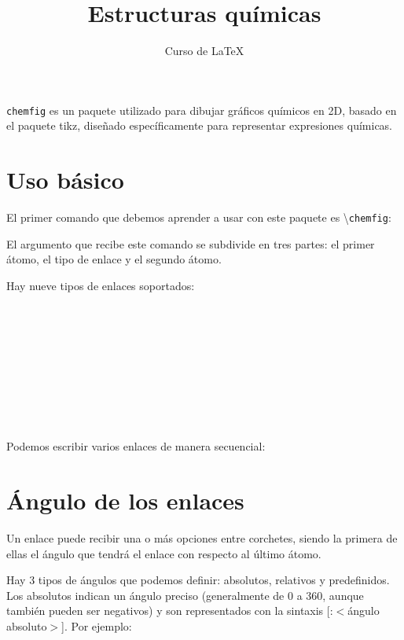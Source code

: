 \documentclass[12pt,letterpaper]{article}
\author{Curso de \LaTeX}
\title{Estructuras químicas}
\begin{document}
\maketitle

\texttt{chemfig} es un paquete utilizado para dibujar gráficos químicos en 2D, basado en el paquete tikz, diseñado específicamente para representar expresiones químicas.

\section{Uso básico}

El primer comando que debemos aprender a usar con este paquete es \textbackslash\texttt{chemfig}:

\begin{center}
\end{center}

El argumento que recibe este comando se subdivide en tres partes: el primer átomo, el tipo de enlace y el segundo átomo.

Hay nueve tipos de enlaces soportados:

\begin{center}
\\
\\
\\
\\
\\
\\
\\
\\
\end{center}

Podemos escribir varios enlaces de manera secuencial:

\begin{center}
\end{center}

\section{Ángulo de los enlaces}

Un enlace puede recibir una o más opciones entre corchetes, siendo la primera de ellas el ángulo que tendrá el enlace con respecto al último átomo.

Hay 3 tipos de ángulos que podemos definir: absolutos, relativos y predefinidos. Los absolutos indican un ángulo preciso (generalmente de 0 a 360, aunque también pueden ser negativos) y son representados con la sintaxis [:$ < $ángulo absoluto$ > $]. Por ejemplo:
\end{document}
